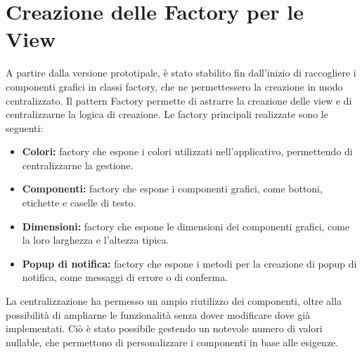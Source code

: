 \section{Creazione delle Factory per le View}
A partire dalla versione prototipale, è stato stabilito fin dall'inizio di
raccogliere i componenti grafici in classi factory, che ne permettessero la creazione in modo centralizzato.
Il pattern Factory permette di astrarre la creazione delle view e di centralizzarne la logica di creazione.
Le factory principali realizzate sono le seguenti:
\begin{itemize}
    \item \textbf{Colori:} factory che espone i colori utilizzati nell'applicativo,
          permettendo di centralizzarne la gestione.
    \item \textbf{Componenti:} factory che espone i componenti grafici, come bottoni, etichette e caselle di testo.
    \item \textbf{Dimensioni:} factory che espone le dimensioni dei componenti grafici,
          come la loro larghezza e l'altezza tipica.
    \item \textbf{Popup di notifica:} factory che espone i metodi per la creazione di popup di notifica,
          come messaggi di errore o di conferma.
\end{itemize}
La centralizzazione ha permesso un ampio riutilizzo dei componenti,
oltre alla possibilità di ampliarne le funzionalità senza dover modificare dove già implementati.
Ciò è stato possibile gestendo un notevole numero di valori nullable,
che permettono di personalizzare i componenti in base alle esigenze.
